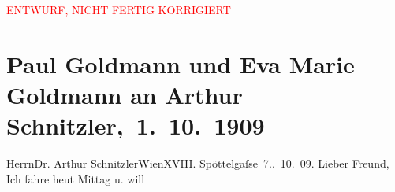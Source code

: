 
\begin{center}
            \textcolor{red}{ENTWURF, NICHT FERTIG KORRIGIERT}
                      \end{center}
            
         
         \renewcommand{\erwaehntePersonen}{Personen: Margarethe Fränkel, Olga Schnitzler, Hans Tietze, Erica Tietze-Conrat}
         \renewcommand{\erwaehnteInstitutionen}{Institutionen: Hotel Sacher}
         \renewcommand{\erwaehnteOrte}{Orte: Armbrustergasse, Edmund-Weiß-Gasse, Hohe Warte, Hotel Sacher, Sternwartestraße, Wien}
         \renewcommand{\erwaehnteWerke}{}
               \section[ Paul Goldmann und Eva Marie Goldmann an Arthur Schnitzler, 1. 10. 1909]{ Paul Goldmann und Eva Marie Goldmann an Arthur
               Schnitzler, 1. 10. 1909}\nopagebreak{}\rehead{ }\begin{ledgroupsized}[t]{13cm}\normalsize\beginnumbering \toendnotes[C]{\smallbreak\pagebreak[2]} 
\toendnotes[C]{\smallbreak}\pstart{}{\pb}Herrn\pend{}\pstart{}Dr. Arthur Schnitzler\pend{}\pstart{}Wien\pend{}\pstart{}XVIII. Spöttelgaſse 7.\pend{}{\bigskip}. 10. 09.\pend
           \pstart
           Lieber Freund, Ich fahre heut{ }Mittag{ }\label{K_L03469-1v}\label{K_L03469-1h} u. will

\end{ledgroupsized}
